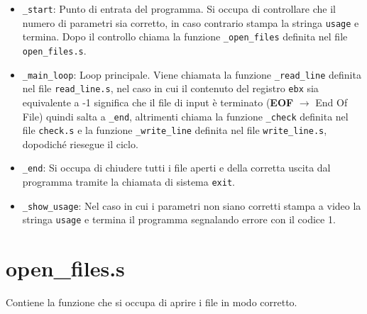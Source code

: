 \documentclass[a4paper,11pt]{article}
\newcommand{\itemtt}[1]{\item \texttt{#1}}
\newcommand{\myparagraph}[2]{
	\begin{table}[!ht]
		\begin{tabular}{p{0.175\linewidth} | p{0.8\linewidth}}
			\texttt{#1} & #2
		\end{tabular}
	\end{table}
			}
\begin{document}
%		
%		
%		
%		
\begin{itemize}
		\itemtt{\_start}: Punto di entrata del programma. Si occupa di controllare che il numero di parametri sia corretto, in caso contrario stampa la stringa \texttt{usage} e termina. Dopo il controllo chiama la funzione \texttt{\_open\_files} definita nel file \texttt{open\_files.s}. 
    	\itemtt{\_main\_loop}: Loop principale. Viene chiamata la funzione \texttt{\_read\_line} definita nel file \texttt{read\_line.s}, nel caso in cui il contenuto del registro \texttt{ebx} sia equivalente a -1 significa che il file di input è terminato (\textbf{EOF} $\rightarrow$ End Of File) quindi salta a \texttt{\_end}, altrimenti chiama la funzione \texttt{\_check} definita nel file \texttt{check.s} e la funzione \texttt{\_write\_line} definita nel file \texttt{write\_line.s}, dopodiché riesegue il ciclo.
		\itemtt{\_end}: Si occupa di chiudere tutti i file aperti e della corretta uscita dal programma tramite la chiamata di sistema \texttt{exit}.
		\itemtt{\_show\_usage}: Nel caso in cui i parametri non siano corretti stampa a video la stringa \texttt{usage} e termina il programma segnalando errore con il codice 1.
	\end{itemize}  
	
	\section{open\_files.s}
	Contiene la funzione che si occupa di aprire i file in modo corretto.
	
\end{document}
